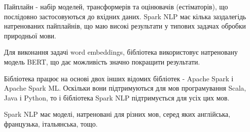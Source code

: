 Пайплайн - набір моделей, трансформерів та оцінювачів (естіматорів), що послідовно застосовуються до вхідних даних. Spark NLP має кілька заздалегідь натренованих пайплайнів, що маю високі результати у типових задачах обробки природньої мови. 

Для виконання задачі word embeddings, бібліотека використовує натреновану модель BERT, що дає можливість значно покращити результати.

Бібліотека працює на основі двох інших відомих бібліотек - Apache Spark і Apache Spark ML. Оскільки вони підтримуються для мов програмування Scala, Java і Python, то і бібліотека Spark NLP підтримується для усіх цих мов. 

Spark NLP має моделі, натреновані для різних мов, серед яких англійська, французька, італьянська, тощо.
